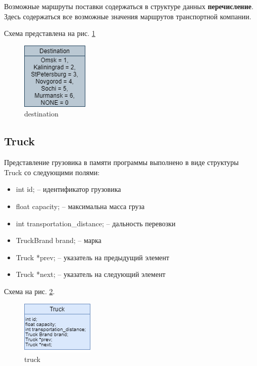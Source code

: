 Возможные маршруты поставки содержаться в структуре данных  \textbf{перечисление}.
Здесь содержаться все возможные значения маршрутов транспортной компании. 

Схема представлена на рис. \ref{destination}

\begin{figure}[hpt!]
    \centering
    \includegraphics[width=0.4\linewidth]{photo/destination}
    \caption{destination}
    \label{destination}
\end{figure}

\subsection{Truck}

Представление грузовика в памяти программы выполнено в виде структуры Truck со следующими полями:

\begin{itemize}
    \item int id; -- идентификатор грузовика
    \item float capacity; -- максимальна масса груза
    \item int transportation\_distance; -- дальность перевозки
    \item TruckBrand brand; -- марка
    \item Truck *prev; -- указатель на предыдущий элемент
    \item Truck *next; -- указатель  на следующий элемент
\end{itemize}

Схема на рис. \ref{truck}.

\begin{figure}[H]
    \centering
    \includegraphics[width=0.4\linewidth]{photo/truck}
    \caption{truck}
    \label{truck}
\end{figure}

